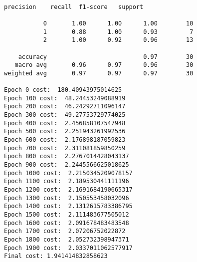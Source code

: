 \documentclass[11pt]{article}
\begin{document}
    \begin{center}
    \end{center}
    { \hspace*{\fill} \\}
    
    \begin{Verbatim}[commandchars=\\\{\}]
              precision    recall  f1-score   support

           0       1.00      1.00      1.00        10
           1       0.88      1.00      0.93         7
           2       1.00      0.92      0.96        13

    accuracy                           0.97        30
   macro avg       0.96      0.97      0.96        30
weighted avg       0.97      0.97      0.97        30

Epoch 0 cost:  180.40943975014625
Epoch 100 cost:  48.24453249088919
Epoch 200 cost:  46.24292711096147
Epoch 300 cost:  49.27753729774025
Epoch 400 cost:  2.456858107547948
Epoch 500 cost:  2.251943261992536
Epoch 600 cost:  2.176898187059823
Epoch 700 cost:  2.311081859850259
Epoch 800 cost:  2.2767014428043137
Epoch 900 cost:  2.2445566625018625
Epoch 1000 cost:  2.2150345209078157
Epoch 1100 cost:  2.189530441111196
Epoch 1200 cost:  2.1691684190665317
Epoch 1300 cost:  2.150553458032096
Epoch 1400 cost:  2.1312615783386795
Epoch 1500 cost:  2.111483677505012
Epoch 1600 cost:  2.091678483483548
Epoch 1700 cost:  2.07206752022872
Epoch 1800 cost:  2.052732398947371
Epoch 1900 cost:  2.0337011062577917
Final cost: 1.941414832858623

    \end{Verbatim}

    \begin{center}
    \end{center}
    { \hspace*{\fill} \\}
    
\end{document}
